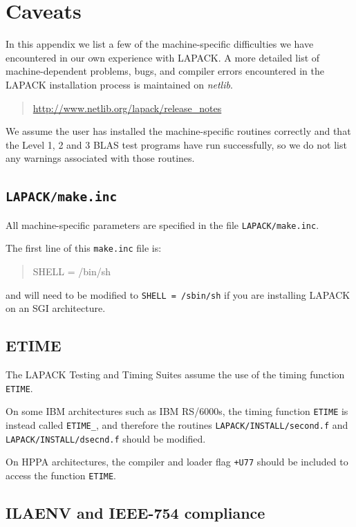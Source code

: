 \documentclass[11pt]{report}
\begin{document}
\chapter{Caveats}\label{appendixd}

In this appendix we list a few of the machine-specific difficulties we
have
encountered in our own experience with LAPACK.  A more detailed list
of machine-dependent problems, bugs, and compiler errors encountered
in the LAPACK installation process is maintained
on \emph{netlib}.
\begin{quote}
\url{http://www.netlib.org/lapack/release\_notes}
\end{quote}

We assume the user has installed the machine-specific routines
correctly and that the Level 1, 2 and 3 BLAS test programs have run
successfully, so we do not list any warnings associated with those
routines.

\section{\texttt{LAPACK/make.inc}}

All machine-specific
parameters are specified in the file \texttt{LAPACK/make.inc}.

The first line of this \texttt{make.inc} file is:
\begin{quote}
SHELL = /bin/sh
\end{quote}
and will need to be modified to \texttt{SHELL = /sbin/sh} if you are
installing LAPACK on an SGI architecture.

\section{ETIME}

The LAPACK Testing
and Timing Suites assume the use of the timing function \texttt{ETIME}.

On some IBM architectures such as IBM RS/6000s, the timing function
\texttt{ETIME} is instead called \texttt{ETIME\_}, and therefore the routines
\texttt{LAPACK/INSTALL/second.f} and \texttt{LAPACK/INSTALL/dsecnd.f} should
be modified.

On HPPA architectures,
the compiler and loader flag \texttt{+U77} should be included to access
the function \texttt{ETIME}.

\section{ILAENV and IEEE-754 compliance}
\end{document}
